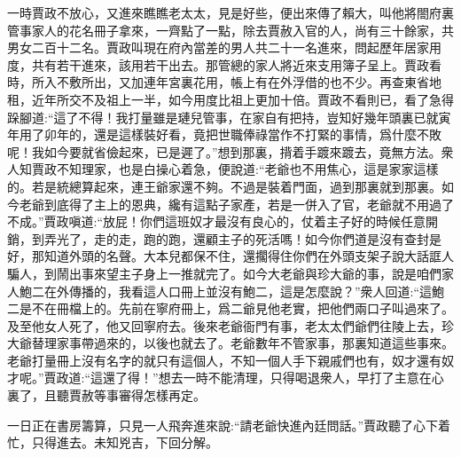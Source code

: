 \begin{parag}
\end{parag}


\begin{parag}
    一時賈政不放心，又進來瞧瞧老太太，見是好些，便出來傳了賴大，叫他將閤府裏管事家人的花名冊子拿來，一齊點了一點，除去賈赦入官的人，尚有三十餘家，共男女二百十二名。賈政叫現在府內當差的男人共二十一名進來，問起歷年居家用度，共有若干進來，該用若干出去。那管總的家人將近來支用簿子呈上。賈政看時，所入不敷所出，又加連年宮裏花用，帳上有在外浮借的也不少。再查東省地租，近年所交不及祖上一半，如今用度比祖上更加十倍。賈政不看則已，看了急得跺腳道:“這了不得！我打量雖是璉兒管事，在家自有把持，豈知好幾年頭裏已就寅年用了卯年的，還是這樣裝好看，竟把世職俸祿當作不打緊的事情，爲什麼不敗呢！我如今要就省儉起來，已是遲了。”想到那裏，揹着手踱來踱去，竟無方法。衆人知賈政不知理家，也是白操心着急，便說道:“老爺也不用焦心，這是家家這樣的。若是統總算起來，連王爺家還不夠。不過是裝着門面，過到那裏就到那裏。如今老爺到底得了主上的恩典，纔有這點子家產，若是一併入了官，老爺就不用過了不成。”賈政嗔道:“放屁！你們這班奴才最沒有良心的，仗着主子好的時候任意開銷，到弄光了，走的走，跑的跑，還顧主子的死活嗎！如今你們道是沒有查封是好，那知道外頭的名聲。大本兒都保不住，還擱得住你們在外頭支架子說大話誆人騙人，到鬧出事來望主子身上一推就完了。如今大老爺與珍大爺的事，說是咱們家人鮑二在外傳播的，我看這人口冊上並沒有鮑二，這是怎麼說？”衆人回道:“這鮑二是不在冊檔上的。先前在寧府冊上，爲二爺見他老實，把他們兩口子叫過來了。及至他女人死了，他又回寧府去。後來老爺衙門有事，老太太們爺們往陵上去，珍大爺替理家事帶過來的，以後也就去了。老爺數年不管家事，那裏知道這些事來。老爺打量冊上沒有名字的就只有這個人，不知一個人手下親戚們也有，奴才還有奴才呢。”賈政道:“這還了得！”想去一時不能清理，只得喝退衆人，早打了主意在心裏了，且聽賈赦等事審得怎樣再定。
\end{parag}


\begin{parag}
    一日正在書房籌算，只見一人飛奔進來說:“請老爺快進內廷問話。”賈政聽了心下着忙，只得進去。未知兇吉，下回分解。
\end{parag}
